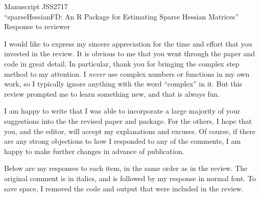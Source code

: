 \documentclass{article}
\begin{document}
{\bfseries
\begin{center}
  Manuscript JSS2717\\
 ``sparseHessianFD: An R Package for Estimating Sparse
 Hessian Matrices''\\
 \vspace{\baselineskip}
 Response to reviewer
\end{center}
}
\vspace{\baselineskip}

I would like to express my sincere appreciation for the time and effort that
you invested in the review.  It is obvious to me that you went through
the paper and code in great detail.  In
particular, thank you for bringing the complex step
method to my attention.  I \emph{never} use complex numbers or
functions in my own work, so I typically ignore anything with the word
``complex'' in it.  But this review prompted me to learn something
new, and that is always fun.

I am happy to write that I was able to incorporate a large majority of
your suggestions into the the revised paper and package. For the
others, I hope that you, and the editor, will accept my
explanations and excuses.  Of course, if there are any strong
objections to how I responded to any of the comments, I am happy
to make further changes in advance of publication.

Below are my responses to each item, in the same order as in the
review.  The original comment is in italics, and is followed by my
response in normal font.  To save space, I removed the code and output
that were included in the review.

\vspace{\baselineskip}
\end{document}
